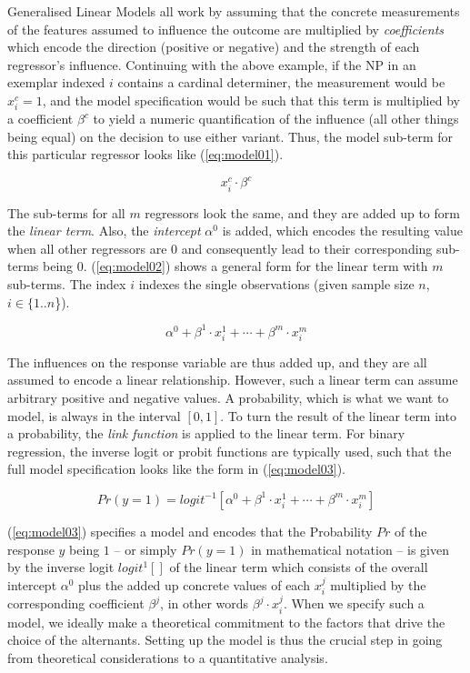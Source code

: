 Generalised Linear Models all work by assuming that the concrete measurements of the features assumed to influence the outcome are multiplied by \textit{coefficients} which encode the direction (positive or negative) and the strength of each regressor's influence.
Continuing with the above example, if the NP in an exemplar indexed $i$ contains a cardinal determiner, the measurement would be $x^c_i=1$, and the model specification would be such that this term is multiplied by a coefficient $\beta^c$ to yield a numeric quantification of the influence (all other things being equal) on the decision to use either variant.
Thus, the model sub-term for this particular regressor looks like (\ref{eq:model01}).

\begin{equation}
  x^c_i\cdot \beta^c
  \label{eq:model01}
\end{equation}

The sub-terms for all $m$ regressors look the same, and they are added up to form the \textit{linear term}.
Also, the \textit{intercept} $\alpha^0$ is added, which encodes the resulting value when all other regressors are 0 and consequently lead to their corresponding sub-terms being 0.
(\ref{eq:model02}) shows a general form for the linear term with $m$ sub-terms.
The index $i$ indexes the single observations (given sample size $n$, $i\in \{1..n$\}).

\begin{equation}
  \alpha^0+\beta^1\cdot x^1_i+\cdots+\beta^m\cdot x^m_i
  \label{eq:model02}
\end{equation}

The influences on the response variable are thus added up, and they are all assumed to encode a linear relationship.
However, such a linear term can assume arbitrary positive and negative values.
A probability, which is what we want to model, is always in the interval $[0,1]$.
To turn the result of the linear term into a probability, the \textit{link function} is applied to the linear term.
For binary regression, the inverse logit or probit functions are typically used, such that the full model specification looks like the form in (\ref{eq:model03}).

\begin{equation}
  Pr(y=1)=logit^{-1}\left[\alpha^0+\beta^1\cdot x^1_i+\cdots+\beta^m\cdot x^m_i\right]
  \label{eq:model03}
\end{equation}

(\ref{eq:model03}) specifies a model and encodes that the Probability $Pr$ of the response $y$ being $1$ -- or simply $Pr(y=1)$ in mathematical notation -- is given by the inverse logit $logit^1[]$ of the linear term which consists of the overall intercept $\alpha^0$ plus the added up concrete values of each $x_i^j$ multiplied by the corresponding coefficient $\beta^j$, in other words $\beta^j\cdot x_i^j$.
When we specify such a model, we ideally make a theoretical commitment to the factors that drive the choice of the alternants.
Setting up the model is thus the crucial step in going from theoretical considerations to a quantitative analysis.

